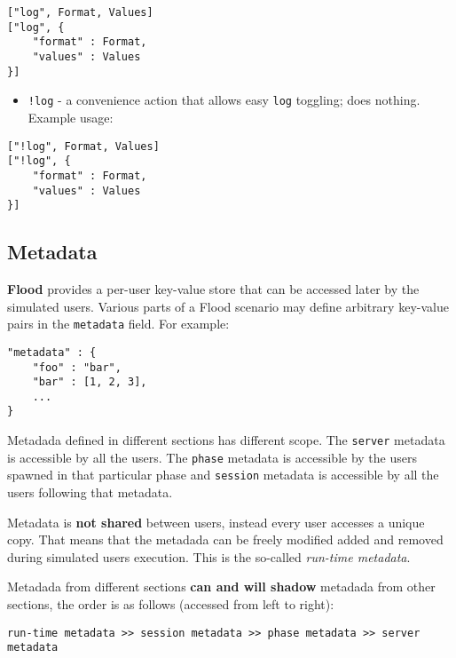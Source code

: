 \documentclass[a4paper]{article}
\begin{document}
\begin{verbatim}
["log", Format, Values]
["log", {
    "format" : Format,
    "values" : Values
}]
\end{verbatim}





\begin{itemize}
\item \texttt{!log} - a convenience action that allows easy \texttt{log} toggling; does nothing. Example usage:
\end{itemize}

\begin{verbatim}
["!log", Format, Values]
["!log", {
    "format" : Format,
    "values" : Values
}]
\end{verbatim}
\subsection{Metadata}
\label{sec-3-6}
\label{ref-metadata}


\textbf{Flood} provides a per-user key-value store that can be accessed later by the simulated users. Various parts of a Flood scenario may define arbitrary key-value pairs in the \texttt{metadata} field. For example:


\begin{verbatim}
"metadata" : {
    "foo" : "bar",
    "bar" : [1, 2, 3],
    ...
}
\end{verbatim}




\noindent
Metadada defined in different sections has different scope. The \texttt{server} metadata is accessible by all the users. The \texttt{phase} metadata is accessible by the users spawned in that particular phase and \texttt{session} metadata is accessible by all the users following that metadata.

\noindent
Metadata is \textbf{not shared} between users, instead every user accesses a unique copy. That means that the metadada can be freely modified added and removed during simulated users execution. This is the so-called \emph{run-time metadata}.

\noindent
Metadada from different sections \textbf{can and will shadow} metadada from other sections, the order is as follows (accessed from left to right):


\begin{verbatim}
run-time metadata >> session metadata >> phase metadata >> server metadata
\end{verbatim}
\end{document}
